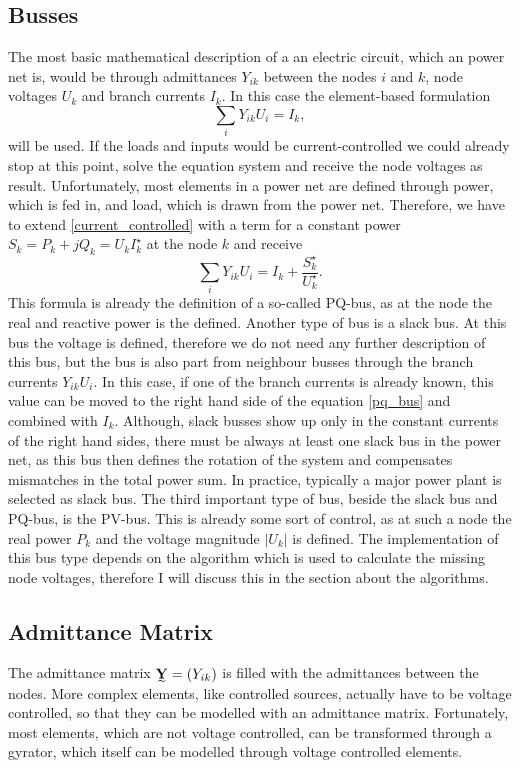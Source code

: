 \subsection{Busses}
The most basic mathematical description of a an electric circuit, which an power net is, would be through admittances $Y_{ik}$ between the nodes $i$ and $k$, node voltages $U_k$ and branch currents $I_k$. In this case the element-based formulation
\begin{equation}
	\sum_i Y_{ik} U_i = I_k,
	\label{eq:current_controlled}
\end{equation}
will be used. If the loads and inputs would be current-controlled we could already stop at this point, solve the equation system and receive the node voltages as result. Unfortunately, most elements in a power net are defined through power, which is fed in, and load, which is drawn from the power net. Therefore, we have to extend \eqref{current_controlled} with a term for a constant power $S_k = P_k + j Q_k = U_k I_k^\star$ at the node $k$ and receive
\begin{equation}
	\sum_i Y_{ik} U_i = I_k + \frac{S_k^\star}{U_k^\star}.
	\label{eq:pq_bus}
\end{equation}
This formula is already the definition of a so-called PQ-bus, as at the node the real and reactive power is the defined.
Another type of bus is a slack bus. At this bus the voltage is defined, therefore we do not need any further description of this bus, but the bus is also part from neighbour busses through the branch currents $Y_{ik} U_i$. In this case, if one of the branch currents is already known, this value can be moved to the right hand side of the equation \eqref{pq_bus} and combined with $I_k$. Although, slack busses show up only in the constant currents of the right hand sides, there must be always at least one slack bus in the power net, as this bus then defines the rotation of the system and compensates mismatches in the total power sum. In practice, typically a major power plant is selected as slack bus.
The third important type of bus, beside the slack bus and PQ-bus, is the PV-bus. This is already some sort of control, as at such a node the real power $P_k$ and the voltage magnitude $|U_k|$ is defined. The implementation of this bus type depends on the algorithm which is used to calculate the missing node voltages, therefore I will discuss this in the section about the algorithms.

\subsection{Admittance Matrix}
The admittance matrix $\mat Y = (Y_{ik})$ is filled with the admittances between the nodes. More complex elements, like controlled sources, actually have to be voltage controlled, so that they can be modelled with an admittance matrix. Fortunately, most elements, which are not voltage controlled, can be transformed through a gyrator, which itself can be modelled through voltage controlled elements.

